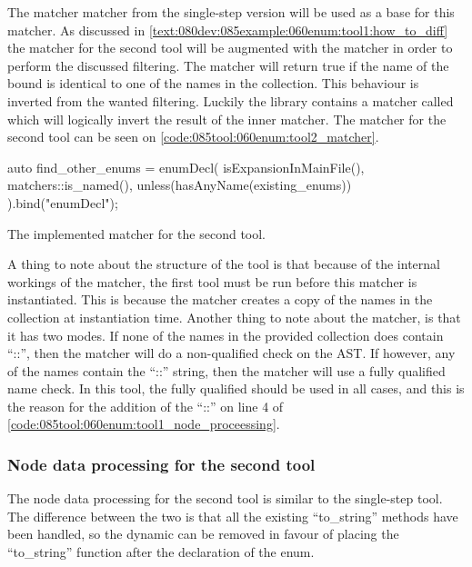 The matcher  matcher from the single-step version will be used as a base for this matcher. 
As discussed in \cref{text:080dev:085example:060enum:tool1:how_to_diff} the matcher for the second tool will be augmented with the  matcher in order to perform the discussed filtering.
The  matcher will return true if the name of the bound  is identical to one of the names in the collection. 
This behaviour is inverted from the wanted filtering. 
Luckily the library contains a matcher called  which will logically invert the result of the inner matcher. The matcher for the second tool can be seen on \cref{code:085tool:060enum:tool2_matcher}.

\begin{listing}[H]
  \begin{cppcode}
auto find_other_enums = enumDecl(
    isExpansionInMainFile(),
    matchers::is_named(),
    unless(hasAnyName(existing_enums))
  ).bind("enumDecl");
  \end{cppcode}
  \caption{The implemented matcher for the second tool.}
  \label{code:085tool:060enum:tool2_matcher}
\end{listing}

A thing to note about the structure of the tool is that because of the internal workings of the  matcher, the first tool must be run before this matcher is instantiated. This is because the matcher creates a copy of the names in the collection at instantiation time.
Another thing to note about the  matcher, is that it has two modes. If none of the names in the provided collection does contain ``::'', then the matcher will do a non-qualified check on the AST. If however, any of the names contain the ``::'' string, then the matcher will use a fully qualified name check. In this tool, the fully qualified should be used in all cases, and this is the reason for the addition of the ``::'' on line 4 of \cref{code:085tool:060enum:tool1_node_proceessing}.

\subsubsection*{Node data processing for the second tool}

The node data processing for the second tool is similar to the single-step tool. The difference between the two is that all the existing ``to\_string'' methods have been handled, so the dynamic  can be removed in favour of placing the ``to\_string'' function after the declaration of the enum.